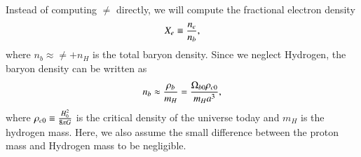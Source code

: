 Instead of computing $\ne$ directly, we will compute the fractional electron density
\begin{equation} \label{eq:M2:theory:X_e_definition}
    X_e \equiv \frac{n_e}{n_b},
\end{equation}
where $n_b\approx\ne+n_H$ is the total baryon density. Since we neglect Hydrogen, the baryon density can be written as    
\begin{equation} \label{eq:M2:theory:helium_baryon_number_density}
    n_b \approx \frac{\rho_b}{m_H} = \frac{\Omega_{b0} \rho_{c0}}{m_H a^3},
\end{equation}
where $\rho_{c0}\equiv \frac{ H_0^2}{8\pi G}$ is the critical density of the universe today and $m_H$ is the hydrogen mass. Here, we also assume the small difference between the proton mass and Hydrogen mass to be negligible.

